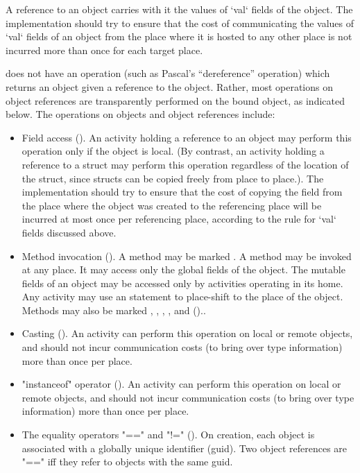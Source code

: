 A reference to an object carries with it the values of   \xcd`val`
fields
of the object. The implementation should try to ensure that the cost
of communicating the values of \xcd`val` fields of an object from the
place where it is hosted to any other place is not incurred more than
once for each target place.

{}\Xten{} does not have an operation (such as Pascal's ``dereference''
operation) which returns an object given a reference to the
object. Rather, most operations on object references are transparently
performed on the bound object, as indicated below. The operations on
objects and object references include:
\begin{itemize}

{}\item Field access (). An activity holding a
reference to an object may perform this operation only if the
object is local.  (By contrast, an activity holding a reference to a struct
may perform this operation regardless of the location of the struct, 
since structs can be copied freely from place to place.).  The
implementation should try to ensure that the cost of copying the field
from the place where the object was created to the referencing place
will be incurred at most once per referencing place, according to the
rule for \xcd`val` fields discussed above.

{}\item Method invocation ().  
\label{GlobalAnnotation}
A method may be
marked . A  method may be invoked at any
place. It may access only the global fields of the object. The
mutable fields of an object may be accessed only by activities
operating in its home.  Any activity may use an  statement
to place-shift to the place of the object. Methods may also be
marked , , ,
, and  ()..

{}\item Casting ().  An activity can perform this
operation on local or remote objects, and should not incur
communication costs (to bring over type information) more than once
per place.

{}\item \xcd"instanceof" operator ().  An activity
can perform this operation on local or remote objects, and should not
incur communication costs (to bring over type information) more than
once per place.

\item The equality operators \xcd"==" and \xcd"!="
(). On creation, each object is associated with a globally
unique identifier (guid). Two object references are \xcd"==" iff they refer to objects
with the  same guid.

\end{itemize}

